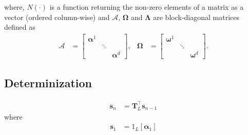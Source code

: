 where, $N(\cdot)$ is a function returning the non-zero elements of a matrix
as a vector (ordered column-wise) and $\boldsymbol{\mathcal{A}}$,
$\boldsymbol{\Omega}$ and $\boldsymbol{\Lambda}$ are block-diagonal
matrices defined as
\begin{align}
    \boldsymbol{\mathcal{A}} &= \begin{bmatrix}
        \boldsymbol{\alpha}^1 & & \\
            & \ddots & \\
            & & \boldsymbol{\alpha}^d
        \end{bmatrix}, &
    \boldsymbol{\Omega} &= \begin{bmatrix}
        \boldsymbol{\omega}^1 & & \\
            & \ddots & \\
            & & \boldsymbol{\omega}^d
        \end{bmatrix}.
\end{align}

\subsection{Determinization}

\begin{align}
    \mathbf{s}_n &= \mathbf{T}_L^\top \mathbf{s}_{n-1}
\end{align}
where
\begin{align}
    \mathbf{s}_1 &= 1_L[\boldsymbol{\alpha}_1]
\end{align}

